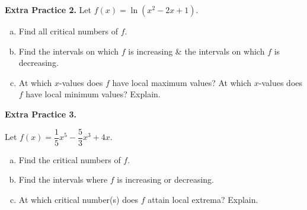 \documentclass[10pt]{article}
\begin{document}
{\bf\color{blue} Extra Practice 2.} \reversemarginpar{} Let $f(x)=\ln(x^2-2x+1)$. 
\begin{enumerate}[(a)]
\item Find all critical numbers of $f$.
    \vfill
    
\item Find the intervals on which $f$ is increasing \& the intervals on which $f$ is decreasing.
    \vfill
    \vfill

\item At which $x$-values does $f$ have local maximum values? At which $x$-values does $f$ have local minimum values? Explain.
    \vfill
\end{enumerate}

\newpage%

{\bf\color{blue} Extra Practice 3.} \reversemarginpar{}

Let $f(x)=\dfrac15x^5-\dfrac53x^3+4x$.
\begin{enumerate}[(a)]
\item Find the critical numbers of $f$.
    \vfill
\item Find the intervals where $f$ is increasing or decreasing.
    \vfill
    \vfill
\item At which critical number(s) does $f$ attain local extrema? Explain.
    \vfill
    \vfill
\end{enumerate}
\end{document}
